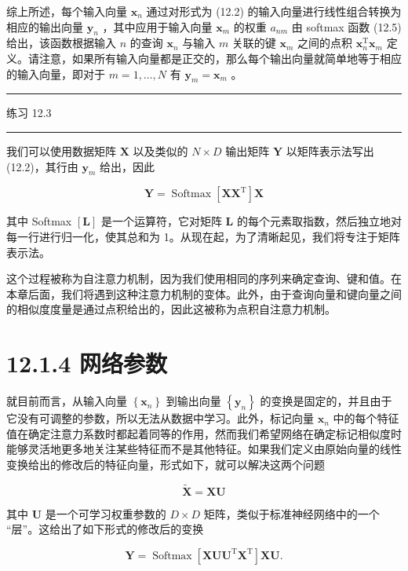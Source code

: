\documentclass[10pt]{report}
\newcommand{\HRule}{\begin{center}\rule{0.9\linewidth}{0.2mm}\end{center}}
\begin{document}
综上所述，每个输入向量 \({\mathbf{x}}_{n}\) 通过对形式为 (12.2) 的输入向量进行线性组合转换为相应的输出向量 \({\mathbf{y}}_{n}\) ，其中应用于输入向量 \({\mathbf{x}}_{m}\) 的权重 \({a}_{nm}\) 由 softmax 函数 (12.5) 给出，该函数根据输入 \(n\) 的查询 \({\mathbf{x}}_{n}\) 与输入 \(m\) 关联的键 \({\mathbf{x}}_{m}\) 之间的点积 \({\mathbf{x}}_{n}^{\mathrm{T}}{\mathbf{x}}_{m}\) 定义。请注意，如果所有输入向量都是正交的，那么每个输出向量就简单地等于相应的输入向量，即对于 \(m = 1,\ldots ,N\) 有 \({\mathbf{y}}_{m} = {\mathbf{x}}_{m}\) 。

\HRule

练习 12.3

\HRule

我们可以使用数据矩阵 \(\mathbf{X}\) 以及类似的 \(N \times  D\) 输出矩阵 \(\mathbf{Y}\) 以矩阵表示法写出 (12.2)，其行由 \({\mathbf{y}}_{m}\) 给出，因此

\[
\mathbf{Y} = \operatorname{Softmax}\left\lbrack  {\mathbf{X}{\mathbf{X}}^{\mathrm{T}}}\right\rbrack  \mathbf{X} \tag{12.6}
\]

其中 Softmax \(\left\lbrack  \mathbf{L}\right\rbrack\) 是一个运算符，它对矩阵 \(\mathbf{L}\) 的每个元素取指数，然后独立地对每一行进行归一化，使其总和为 1。从现在起，为了清晰起见，我们将专注于矩阵表示法。

这个过程被称为自注意力机制，因为我们使用相同的序列来确定查询、键和值。在本章后面，我们将遇到这种注意力机制的变体。此外，由于查询向量和键向量之间的相似度度量是通过点积给出的，因此这被称为点积自注意力机制。

\section*{12.1.4 网络参数}

就目前而言，从输入向量 \(\left\{  {\mathbf{x}}_{n}\right\}\) 到输出向量 \(\left\{  {\mathbf{y}}_{n}\right\}\) 的变换是固定的，并且由于它没有可调整的参数，所以无法从数据中学习。此外，标记向量 \({\mathbf{x}}_{n}\) 中的每个特征值在确定注意力系数时都起着同等的作用，然而我们希望网络在确定标记相似度时能够灵活地更多地关注某些特征而不是其他特征。如果我们定义由原始向量的线性变换给出的修改后的特征向量，形式如下，就可以解决这两个问题

\[
\widetilde{\mathbf{X}} = \mathbf{{XU}} \tag{12.7}
\]

其中 \(\mathbf{U}\) 是一个可学习权重参数的 \(D \times  D\) 矩阵，类似于标准神经网络中的一个 “层”。这给出了如下形式的修改后的变换

\[
\mathbf{Y} = \operatorname{Softmax}\left\lbrack  {{\mathbf{{XUU}}}^{\mathrm{T}}{\mathbf{X}}^{\mathrm{T}}}\right\rbrack  \mathbf{{XU}}. \tag{12.8}
\]
\end{document}
